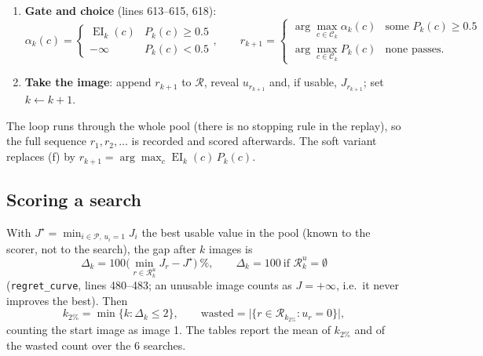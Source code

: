 \documentclass[10pt,a4paper]{article}
\newcommand{\code}[1]{\texttt{\small #1}}
\newcommand{\EI}{\operatorname{EI}}
\begin{document}
\begin{enumerate}[label=(\alph*),leftmargin=2em]
  refitted from scratch on all fleet images, usable or not, and every image taken so far:
  \begin{equation}
  \mathcal U_k=\{(x_i,u_i):i\in\mathcal F\}\ \cup\ \{(x_r,u_r):r\in\mathcal R_k\},\qquad P_k(c)=P(u=1\mid x_c)\ \text{for }c\in\mathcal C_k ;
  \end{equation}
  if $\mathcal U_k$ holds fewer than two unusable images, $P_k\equiv1$. Unlike the GP, the classifier learns from the new
  amplifier's \emph{failed} images too.
\item \textbf{Gate and choice} (lines 613--615, 618):
  \begin{equation}
  \alpha_k(c)=\begin{cases}\EI_k(c)&P_k(c)\ge0.5\\-\infty&P_k(c)<0.5\end{cases},\qquad
  r_{k+1}=\begin{cases}\arg\max_{c\in\mathcal C_k}\alpha_k(c) & \text{some }P_k(c)\ge0.5\\[2pt]
  \arg\max_{c\in\mathcal C_k}P_k(c) & \text{none passes.}\end{cases}
  \end{equation}
\item \textbf{Take the image}: append $r_{k+1}$ to $\mathcal R$, reveal $u_{r_{k+1}}$ and, if usable, $J_{r_{k+1}}$; set $k\leftarrow k+1$.
\end{enumerate}
The loop runs through the whole pool (there is no stopping rule in the replay), so the full sequence $r_1,r_2,\dots$ is recorded and
scored afterwards. The soft variant replaces (f) by $r_{k+1}=\arg\max_c\EI_k(c)\,P_k(c)$.

\subsection{Scoring a search}
With $J^\star=\min_{i\in\mathcal P,\,u_i=1}J_i$ the best usable value in the pool (known to the scorer, not to the search), the gap after
$k$ images is
\begin{equation}
\Delta_k=100\Big(\min_{r\in\mathcal R^u_k}J_r-J^\star\Big)\ \%,\qquad \Delta_k=100\ \text{if }\mathcal R^u_k=\emptyset
\end{equation}
(\code{regret\_curve}, lines 480--483; an unusable image counts as $J=+\infty$, i.e.\ it never improves the best). Then
\begin{equation}
k_{2\%}=\min\{k:\Delta_k\le2\},\qquad \text{wasted}=\big|\{r\in\mathcal R_{k_{2\%}}:u_r=0\}\big|,
\end{equation}
counting the start image as image 1. The tables report the mean of $k_{2\%}$ and of the wasted count over the 6 searches.
\end{document}
